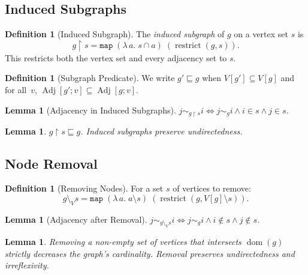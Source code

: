 \documentclass[11pt]{article}
\theoremstyle{plain}
\newtheorem{lemma}[theorem]{Lemma}
\theoremstyle{definition}
\newtheorem{definition}[theorem]{Definition}
\theoremstyle{remark}
\newcommand{\restrict}{\operatorname{restrict}}
\newcommand{\verticesof}[1]{V[#1]}
\newcommand{\adjset}[2]{\operatorname{Adj}[#1;#2]}
\newcommand{\induced}[2]{#1\mathbin{\upharpoonright}#2}
\newcommand{\withoutvertices}[2]{#1\mathbin{\setminus_{V}}#2}
\newcommand{\subgraphrel}{\sqsubseteq}
\newcommand{\adjacentin}[3]{#1\mathrel{\sim_{#2}}#3}
\begin{document}
\subsection{Induced Subgraphs}

\begin{definition}[Induced Subgraph]
The \emph{induced subgraph} of $g$ on a vertex set $s$ is
\[
  \induced{g}{s} = \texttt{map}\;(\lambda\, a.\; s \cap a)\;(\restrict(g, s)).
\]
This restricts both the vertex set and every adjacency set to $s$.
\end{definition}

\begin{definition}[Subgraph Predicate]
We write $g' \subgraphrel g$ when
$\verticesof{g'} \subseteq \verticesof{g}$ and for all~$v$, $\adjset{g'}{v} \subseteq \adjset{g}{v}$.
\end{definition}

\begin{lemma}[Adjacency in Induced Subgraphs]
$\adjacentin{j}{\induced{g}{s}}{i} \iff \adjacentin{j}{g}{i} \wedge i \in s \wedge j \in s$.
\end{lemma}

\begin{lemma}
$\induced{g}{s} \subgraphrel g$. Induced subgraphs preserve undirectedness.
\end{lemma}

\subsection{Node Removal}

\begin{definition}[Removing Nodes]
For a set $s$ of vertices to remove:
\[
  \withoutvertices{g}{s} = \texttt{map}\;(\lambda\, a.\; a \setminus s)\;(\restrict(g, \verticesof{g} \setminus s)).
\]
\end{definition}

\begin{lemma}[Adjacency after Removal]
\label{lem:adj-remove}
$\adjacentin{j}{\withoutvertices{g}{s}}{i} \iff \adjacentin{j}{g}{i} \wedge i \notin s \wedge j \notin s$.
\end{lemma}

\begin{lemma}
Removing a non-empty set of vertices that intersects $\operatorname{dom}(g)$ strictly decreases the graph's cardinality. Removal preserves undirectedness and irreflexivity.
\end{lemma}
\end{document}
